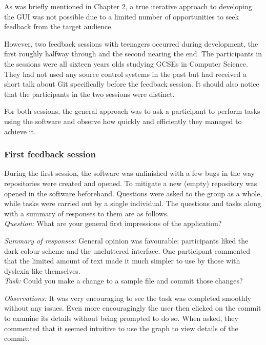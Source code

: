 As was briefly mentioned in Chapter 2, a true iterative approach to developing the GUI was not possible due to a limited number of opportunities to seek feedback from the target audience. 

However, two feedback sessions with teenagers occurred during development, the first roughly halfway through and the second nearing the end. The participants in the sessions were all sixteen years olds studying GCSEs in Computer Science. They had not used any source control systems in the past but had received a short talk about Git specifically before the feedback session. It should also notice that the participants in the two sessions were distinct.

For both sessions, the general approach was to ask a participant to perform tasks using the software and observe how quickly and efficiently they managed to achieve it.

\subsubsection{First feedback session}

During the first session, the software was unfinished with a few bugs in the way repositories were created and opened. To mitigate a new (empty) repository was opened in the software beforehand. Questions were asked to the group as a whole, while tasks were carried out by a single individual. The questions and tasks along with a summary of responses to them are as follows.\\

\noindent \emph{Question: } What are your general first impressions of the application?

\noindent \emph{Summary of responses:} General opinion was favourable; participants liked the dark colour scheme and the uncluttered interface. One participant commented that the limited amount of text made it much simpler to use by those with dyslexia like themselves. \\

\noindent \emph{Task: } Could you make a change to a sample file and commit those changes?

\noindent \emph{Observations: } It was very encouraging to see the task was completed smoothly without any issues. Even more encouragingly the user then clicked on the commit to examine its details without being prompted to do so. When asked, they commented that it seemed intuitive to use the graph to view details of the commit.\\

